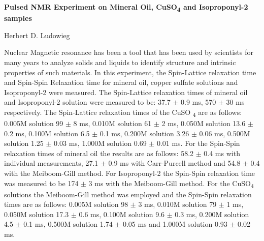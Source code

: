\documentclass{article}
\begin{document}
\Centering
\Large{\textbf{Pulsed NMR Experiment on Mineral Oil, CuSO\textsubscript{4} and 
Isoproponyl-2 samples}} \\
\small{Herbert D. Ludowieg \\
\begin{adjustwidth}{0.5in}{0.5in}
\justify
Nuclear Magnetic resonance has been a tool that has been used by scientists for
many years to analyze solids and liquids to identify structure and intrinsic 
properties of such materials. In this experiment, the Spin-Lattice relaxation 
time and Spin-Spin Relaxation time for mineral oil, copper sulfate solutions 
and Isoproponyl-2 were measured. The Spin-Lattice relaxation times of mineral 
oil and Isoproponyl-2 solution were measured to be: 37.7 $\pm$ 0.9 ms, 570 
$\pm$ 30 ms respectively. The Spin-Lattice relaxation times of the CuSO
\textsubscript{4} are as follows: 0.005M solution 99 $\pm$ 8 ms, 0.010M 
solution 61 $\pm$ 2 ms, 0.050M solution 13.6 $\pm$ 0.2 ms, 0.100M solution
6.5 $\pm$ 0.1 ms, 0.200M solution 3.26 $\pm$ 0.06 ms, 0.500M solution 1.25 
$\pm$ 0.03 ms, 1.000M solution 0.69 $\pm$ 0.01 ms. For the Spin-Spin relaxation 
times of mineral oil the results are as follows: 58.2 $\pm$ 0.4 ms with 
individual measurements, 27.1 $\pm$ 0.9 ms with Carr-Purcell method and 54.8 
$\pm$ 0.4 with the Meiboom-Gill method. For Isoproponyl-2 the Spin-Spin 
relaxation time was measured to be 174 $\pm$ 3 ms with the Meiboom-Gill method. 
For the CuSO\textsubscript{4} solutions the Meiboom-Gill method was employed 
and the Spin-Spin relaxation times are as follows: 0.005M solution 98 $\pm$ 3 
ms, 0.010M solution 79 $\pm$ 1 ms, 0.050M solution 17.3 $\pm$ 0.6 ms, 0.100M 
solution 9.6 $\pm$ 0.3 ms, 0.200M solution 4.5 $\pm$ 0.1 ms, 0.500M solution 
1.74 $\pm$ 0.05 ms and 1.000M solution 0.93 $\pm$ 0.02 ms.
\end{adjustwidth}%
\begin{multicols}{2}
\justify

\end{multicols}}
\end{document}
